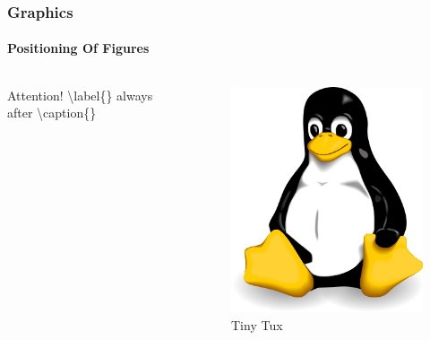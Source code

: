 \begin{frame}
\frametitle{Graphics}
\framesubtitle{Positioning Of Figures}
\begin{columns}
\begin{column}{.5\textwidth}
{\ttfamily {\footnotesize
}}

\begin{alertblock}{Attention!}
\color{nounibaredI}\textbackslash label\color{black}\{\} always after \color{nounibaredI}\textbackslash caption\color{black}\{\}
\end{alertblock}
\end{column}

\begin{column}{.5\textwidth} 
\begin{figure}
\begin{center}
    \includegraphics[width=\textwidth]{image/tux.png}
\caption{Tiny Tux}
\label{img:kleinertux}
\end{center}
\end{figure}
\end{column}
\end{columns}
\end{frame}

